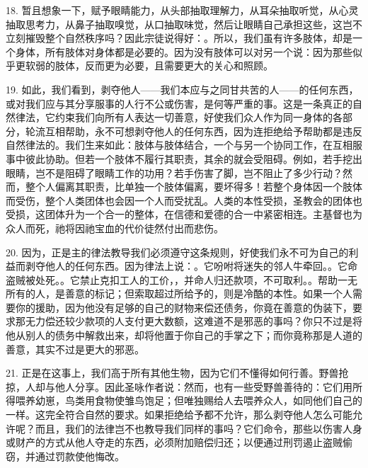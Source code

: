 18. 暂且想象一下，赋予眼睛能力，从头部抽取理解力，从耳朵抽取听觉，从心灵抽取思考力，从鼻子抽取嗅觉，从口抽取味觉，然后让眼睛自己承担这些，这岂不立刻摧毁整个自然秩序吗？因此宗徒说得好：。所以，我们虽有许多肢体，却是一个身体，所有肢体对身体都是必要的。因为没有肢体可以对另一个说：因为那些似乎更软弱的肢体，反而更为必要，且需要更大的关心和照顾。\par

19. 如此，我们看到，剥夺他人——我们本应与之同甘共苦的人——的任何东西，或对我们应与其分享服事的人行不公或伤害，是何等严重的事。这是一条真正的自然律法，它约束我们向所有人表达一切善意，好使我们众人作为同一身体的各部分，轮流互相帮助，永不可想剥夺他人的任何东西，因为连拒绝给予帮助都是违反自然律法的。我们生来如此：肢体与肢体结合，一个与另一个协同工作，在互相服事中彼此协助。但若一个肢体不履行其职责，其余的就会受阻碍。例如，若手挖出眼睛，岂不是阻碍了眼睛工作的功用？若手伤害了脚，岂不阻止了多少行动？然而，整个人偏离其职责，比单独一个肢体偏离，要坏得多！若整个身体因一个肢体而受伤，整个人类团体也会因一个人而受扰乱。人类的本性受损，圣教会的团体也受损，这团体升为一个合一的整体，在信德和爱德的合一中紧密相连。主基督也为众人而死，祂将因祂宝血的代价徒然付出而悲伤。\par

20. 因为，正是主的律法教导我们必须遵守这条规则，好使我们永不可为自己的利益而剥夺他人的任何东西。因为律法上说：。它吩咐将迷失的邻人牛牵回。。它命盗贼被处死。。它禁止克扣工人的工价，，并命人归还款项，不可取利。。帮助一无所有的人，是善意的标记；但索取超过所给予的，则是冷酷的本性。如果一个人需要你的援助，因为他没有足够的自己的财物来偿还债务，你竟在善意的伪装下，要求那无力偿还较少款项的人支付更大数额，这难道不是邪恶的事吗？你只不过是将他从别人的债务中解救出来，却将他置于你自己的手掌之下；而你竟称那是人道的善意，其实不过是更大的邪恶。\par

21. 正是在这事上，我们高于所有其他生物，因为它们不懂得如何行善。野兽抢掠，人却与他人分享。因此圣咏作者说：然而，也有一些受野兽善待的：它们用所得喂养幼崽，鸟类用食物使雏鸟饱足；但唯独赐给人去喂养众人，如同他们自己的一样。这完全符合自然的要求。如果拒绝给予都不允许，那么剥夺他人怎么可能允许呢？而且，我们的法律岂不也教导我们同样的事吗？它们命令，那些以伤害人身或财产的方式从他人夺走的东西，必须附加赔偿归还；以便通过刑罚遏止盗贼偷窃，并通过罚款使他悔改。\par

